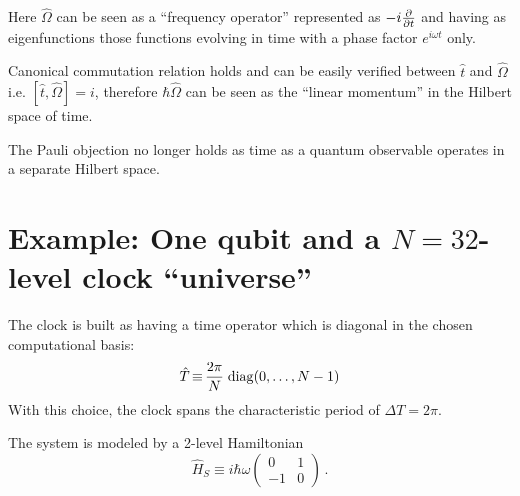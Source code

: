 \documentclass[a0,portrait]{a0poster}
\newcommand{\hilb}[1]{\mathcal{#1}}       %
\DeclareMathOperator*{\repr}{\equiv}      %
\newcommand{\smallback}{\hspace{-0.115em}}
\newcommand{\dket}[1]{\left.\left| #1 \right\rangle\smallback\right\rangle}
\begin{document}
\begin{multicols}{2}
Here $\hat{\Omega}$ can be seen as a ``frequency operator''
represented as $-i\pdv{t}$ and having as eigenfunctions
those functions evolving in time with a phase factor $e^{i \omega t}$ only.

Canonical commutation relation holds and can be easily verified
between $\hat{t}$ and $\hat{\Omega}$
i.e. $[\hat{t}, \hat{\Omega}] = i$,
therefore $\hbar\hat{\Omega}$ can be seen as the ``linear momentum''
in the Hilbert space of time.

The Pauli objection no longer holds as time as a quantum observable operates in a separate Hilbert space.



\section*{Example: One qubit and a $N=32$-level clock ``universe''}

The clock is built as having a time operator which is diagonal in the
chosen computational basis:
\[
  \hat{T} \repr \frac{2\pi}{N} \,\;\! \mathrm{diag}\qty(0, \dots, N-1)
\]
With this choice, the clock spans the characteristic period of $\Delta T = 2\pi$.

The system is modeled by a 2-level Hamiltonian
\[
  \hat{H}_S \repr
  i \hbar \omega
  \begin{pmatrix}
    0   & 1   \\
    -1  & 0
  \end{pmatrix}
  \, \text{.}
\]


\end{multicols}
\end{document}
